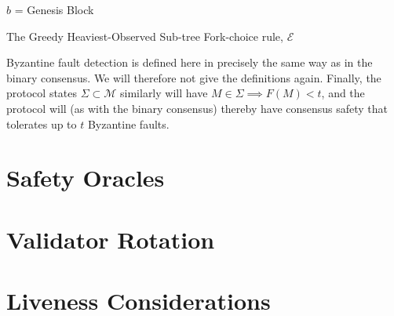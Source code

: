 \documentclass{article}
\theoremstyle{definition}
\begin{document}
\begin{algorithm}[H]
 $b$ = Genesis Block


\caption{The Greedy Heaviest-Observed Sub-tree Fork-choice rule, $\mathcal{E}$}
\end{algorithm}

Byzantine fault detection is defined here in precisely the same way as in the binary consensus. We will therefore not give the definitions again. Finally, the protocol states $\Sigma \subset \mathcal{M}$ similarly will have $M \in \Sigma \implies F(M) < t$, and the protocol will (as with the binary consensus) thereby have consensus safety that tolerates up to $t$ Byzantine faults.

\section{Safety Oracles}

\section{Validator Rotation}

\section{Liveness Considerations}
\end{document}
